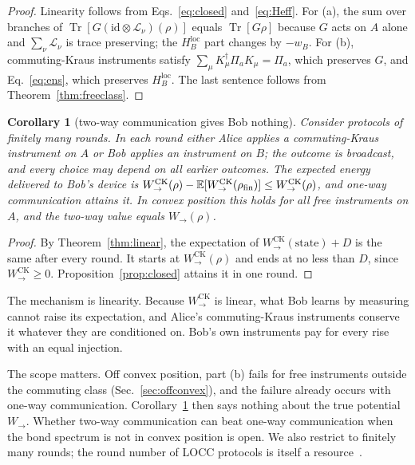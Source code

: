\documentclass[aps,pra,twocolumn,reprint,superscriptaddress,nofootinbib,floatfix]{revtex4-2}
\theoremstyle{plain}
\newtheorem{corollary}{Corollary}
\theoremstyle{remark}
\newcommand{\Tr}{\operatorname{Tr}}
\newcommand{\id}{\mathrm{id}}
\newcommand{\Wto}{W_{\to}}
\newcommand{\WCK}{W_{\to}^{\mathrm{CK}}}
\newcommand{\HBl}{H_B^{\mathrm{loc}}}
\begin{document}
\begin{proof}
Linearity follows from Eqs.~\eqref{eq:closed} and~\eqref{eq:Heff}. For (a), the sum over
branches of $\Tr[G(\id\otimes\mathcal L_\nu)(\rho)]$ equals $\Tr[G\rho]$ because $G$ acts on
$A$ alone and $\sum_\nu\mathcal L_\nu$ is trace preserving; the $\HBl$ part changes by
$-w_B$. For (b), commuting-Kraus instruments satisfy
$\sum_\mu K_\mu^\dagger\Pi_aK_\mu=\Pi_a$, which preserves $G$, and Eq.~\eqref{eq:ens},
which preserves $\HBl$. The last sentence follows from Theorem~\ref{thm:freeclass}.
\end{proof}

\begin{corollary}[two-way communication gives Bob nothing]
\label{cor:twoway}
Consider protocols of finitely many rounds. In each round either Alice applies a
commuting-Kraus instrument on $A$ or Bob applies an instrument on $B$; the outcome is
broadcast, and every choice may depend on all earlier outcomes. The expected energy
delivered to Bob's device is $\WCK(\rho)-\mathbb{E}[\WCK(\rho_{\rm fin})]\le\WCK(\rho)$,
and one-way communication attains it. In convex position this holds for all free
instruments on $A$, and the two-way value equals $\Wto(\rho)$.
\end{corollary}

\begin{proof}
By Theorem~\ref{thm:linear}, the expectation of $\WCK(\text{state})+D$ is the same after
every round. It starts at $\WCK(\rho)$ and ends at no less than $D$, since $\WCK\ge0$.
Proposition~\ref{prop:closed} attains it in one round.
\end{proof}

The mechanism is linearity. Because $\WCK$ is linear, what Bob learns by measuring cannot
raise its expectation, and Alice's commuting-Kraus instruments conserve it whatever they are
conditioned on. Bob's own instruments pay for every rise with an equal injection.

The scope matters. Off convex position, part (b) fails for free instruments outside the
commuting class (Sec.~\ref{sec:offconvex}), and the failure already occurs with one-way
communication. Corollary~\ref{cor:twoway} then says nothing about the true potential
$\Wto$. Whether two-way communication can beat one-way communication when the bond spectrum
is not in convex position is open. We also restrict to finitely many rounds; the round
number of LOCC protocols is itself a resource~\cite{ChitambarGour2019}.
\end{document}
